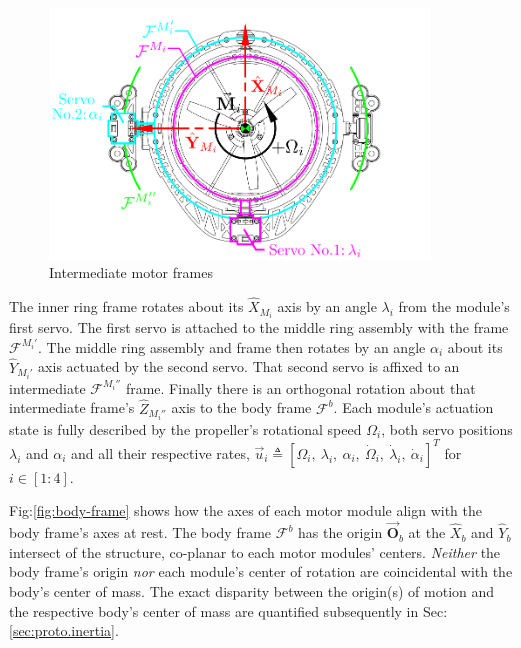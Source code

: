 \begin{figure}[hbtp]
\vspace{-10pt}
\centering
\includegraphics[width=0.9\textwidth]{figs/motor-frame}
\caption{Intermediate motor frames}
\label{fig:motor-frame}
\vspace{-8pt}
\end{figure}
\par
The inner ring frame rotates about its $\hat{X}_{M_i}$ axis by an angle $\lambda_i$ from the module's first servo. The first servo is attached to the middle ring assembly with the frame $\mathcal{F}^{M_i'}$. The middle ring assembly and frame then rotates by an angle $\alpha_i$ about its $\hat{Y}_{M_i'}$ axis actuated by the second servo. That second servo is affixed to an intermediate $\mathcal{F}^{M_i''}$ frame.  Finally there is an orthogonal rotation about that intermediate frame's $\hat{Z}_{M_i''}$ axis to the body frame $\mathcal{F}^b$. Each module's actuation state is fully described by the propeller's rotational speed $\Omega_i$, both servo positions $\lambda_i$ and $\alpha_i$ and all their respective rates, $\vec{u}_i\triangleq[\Omega_{i},~\lambda_{i},~\alpha_{i},~\dot{\Omega}_i,~\dot{\lambda}_i,~\dot{\alpha}_i]^{T}$ for $i\in [1:4]$. 
\par
Fig:\ref{fig:body-frame} shows how the axes of each motor module align with the body frame's axes at rest. The body frame $\mathcal{F}^b$ has the origin $\vec{\mathbf{O}}_b$ at the $\hat{X}_b$ and $\hat{Y}_b$ intersect of the structure, co-planar to each motor modules' centers. \emph{Neither} the body frame's origin \emph{nor} each module's center of rotation are coincidental with the body's center of mass. The exact disparity between the origin(s) of motion and the respective body's center of mass are quantified subsequently in Sec:\ref{sec:proto.inertia}. 
